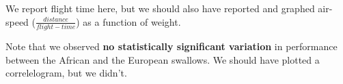 We report flight time here, but we should also have reported and graphed air-speed ($\frac{distance}{flight-time}$) as a function of weight.

Note that we observed \textbf{no statistically significant variation} in performance between the African and the European swallows.  We should have plotted a correlelogram, but we didn't.
